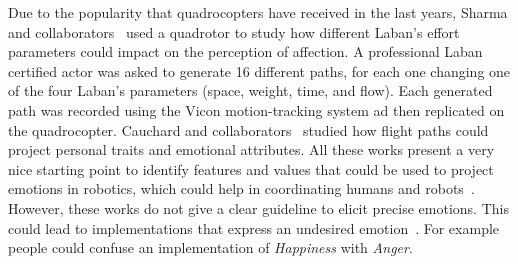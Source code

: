 Due to the popularity that quadrocopters have received in the last years, Sharma and collaborators~\cite{Sharma2013} used a quadrotor to study how different Laban's effort~\cite{Laban1968} parameters could impact on the perception of affection. A professional Laban certified actor was asked to generate 16 different paths, for each one changing one of the four Laban's parameters (space, weight, time, and flow). Each generated path was recorded using the Vicon motion-tracking system ad then replicated on the quadrocopter. Cauchard and collaborators~\cite{Cauchard2016} studied how flight paths could project personal traits and emotional attributes. All these works present a very nice starting point to identify features and values that could be used to project emotions in robotics, which could help in coordinating humans and robots~\cite{Novika2015}. However, these works do not give a clear guideline to elicit precise emotions. This could lead to implementations that express an undesired emotion~\cite{Angel2016}. For example people could confuse an implementation of \textit{Happiness} with \textit{Anger}.
